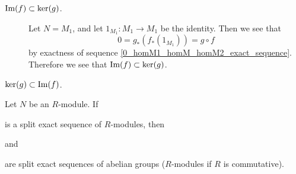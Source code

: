 \begin{prf}
\begin{description}
        \item[$\mbox{Im}(f) \subset \ker(g)$.] 
        Let $N = M_1$, and let $1_{M_1}:M_1 \to M_1$ be the
        identity. Then we see that 
        \[
            0 = g_*(f_*(1_{M_1})) = g \circ f
        \]
        by exactness of sequence
        \ref{0_homM1_homM_homM2_exact_sequence}. Therefore we see
        that $\mbox{Im}(f) \subset \ker(g)$. 

        \item[$\ker(g) \subset \mbox{Im}(f)$.]
        
        


    \end{description}
\end{prf}

\begin{thm}
    Let $N$ be an $R$-module. If 
    \begin{center}
    \end{center}
    is a split exact sequence of $R$-modules, then 
    \begin{center}
    \end{center}
    and 
    \begin{center}
    \end{center}
    are split exact sequences of abelian groups ($R$-modules if
    $R$ is commutative).
\end{thm}


